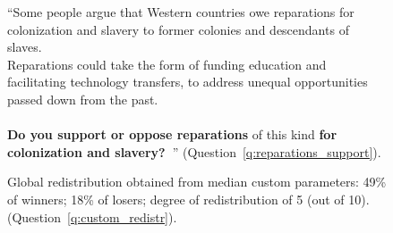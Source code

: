 \begin{figure}[h!]
    \caption[Support for reparations for colonization and slavery]{``Some people argue that Western countries owe reparations for colonization and slavery to former colonies and descendants of slaves. \\Reparations could take the form of funding education and facilitating technology transfers, to address unequal opportunities passed down from the past. \\\\\textbf{Do you support or oppose reparations} of this kind \textbf{for colonization and slavery?~}'' (Question~\ref{q:reparations_support}).
    }\label{fig:reparations_support}
\end{figure}

\begin{figure}[h!]
    \caption[Median custom redistribution]{Global redistribution obtained from median custom parameters: 49\% of winners; 18\% of losers; degree of redistribution of 5 (out of 10). (Question~\ref{q:custom_redistr}).
    }\label{fig:custom_redistr_median}
\end{figure} 

